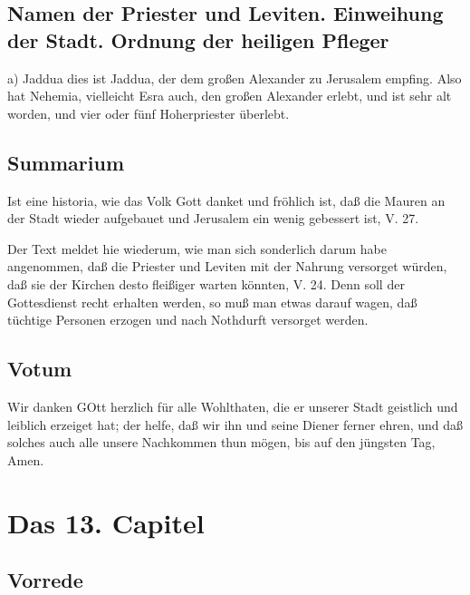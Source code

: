 \section[Namen der Priester und Leviten. Einweihung der Stadt.]{Namen der Priester und Leviten. Einweihung der Stadt. Ordnung der heiligen Pfleger}


a) Jaddua dies ist Jaddua, der dem großen Alexander zu Jerusalem empfing. Also hat Nehemia, vielleicht Esra auch, den großen Alexander erlebt, und ist sehr alt worden, und vier oder fünf Hoherpriester überlebt.


\section{Summarium}

Ist eine historia, wie das Volk Gott danket und fröhlich ist, daß die Mauren an der Stadt wieder aufgebauet und Jerusalem ein wenig gebessert ist, V. 27.

Der Text meldet hie wiederum, wie man sich sonderlich darum habe angenommen, daß die Priester und Leviten mit der Nahrung versorget würden, daß sie der Kirchen desto fleißiger warten könnten, V. 24. Denn soll der Gottesdienst recht erhalten werden, so muß man etwas darauf wagen, daß tüchtige Personen erzogen und nach Nothdurft versorget werden.

\section{Votum}

Wir danken GOtt herzlich für alle Wohlthaten, die er unserer Stadt geistlich und leiblich erzeiget hat; der helfe, daß wir ihn und seine Diener ferner ehren, und daß solches auch alle unsere Nachkommen thun mögen, bis auf den jüngsten Tag, Amen.

\chapter{Das 13. Capitel}

\section{Vorrede}


